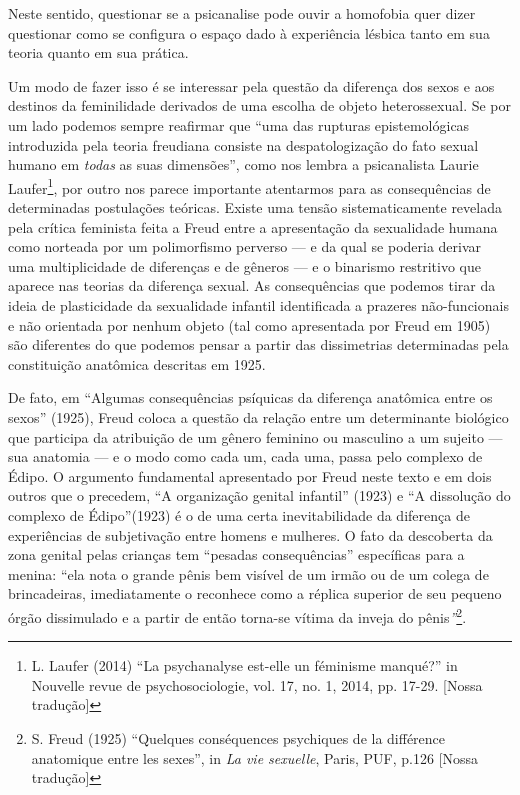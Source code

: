 Neste sentido, questionar se a psicanalise pode ouvir a homofobia quer
dizer questionar como se configura o espaço dado à experiência lésbica
tanto em sua teoria quanto em sua prática.

Um modo de fazer isso é se interessar pela questão da diferença dos
sexos e aos destinos da feminilidade derivados de uma escolha de objeto
heterossexual. Se por um lado podemos sempre reafirmar que ``uma das
rupturas epistemológicas introduzida pela teoria freudiana consiste na
despatologização do fato sexual humano em \emph{todas} as suas
dimensões'', como nos lembra a psicanalista Laurie Laufer\footnote{L.
  Laufer (2014) ``La psychanalyse est-elle un féminisme manqué?'' in
  Nouvelle revue de psychosociologie, vol. 17, no. 1, 2014, pp. 17-29.
  {[}Nossa tradução{]}}, por outro nos parece importante atentarmos para
as consequências de determinadas postulações teóricas. Existe uma tensão
sistematicamente revelada pela crítica feminista feita a Freud entre a
apresentação da sexualidade humana como norteada por um polimorfismo
perverso --- e da qual se poderia derivar uma multiplicidade de
diferenças e de gêneros --- e o binarismo restritivo que aparece nas
teorias da diferença sexual. As consequências que podemos tirar da ideia
de plasticidade da sexualidade infantil identificada a prazeres
não-funcionais e não orientada por nenhum objeto (tal como apresentada
por Freud em 1905) são diferentes do que podemos pensar a partir das
dissimetrias determinadas pela constituição anatômica descritas em 1925.

De fato, em ``Algumas consequências psíquicas da diferença anatômica
entre os sexos'' (1925), Freud coloca a questão da relação entre um
determinante biológico que participa da atribuição de um gênero feminino
ou masculino a um sujeito --- sua anatomia --- e o modo como cada um, cada
uma, passa pelo complexo de Édipo. O argumento fundamental apresentado
por Freud neste texto e em dois outros que o precedem, ``A organização
genital infantil'' (1923) e ``A dissolução do complexo de Édipo''(1923)
é o de uma certa inevitabilidade da diferença de experiências de
subjetivação entre homens e mulheres. O fato da descoberta da zona
genital pelas crianças tem ``pesadas consequências'' específicas para a
menina: ``ela nota o grande pênis bem visível de um irmão ou de um
colega de brincadeiras, imediatamente o reconhece como a réplica
superior de seu pequeno órgão dissimulado e a partir de então torna-se
vítima da inveja do pênis\emph{''}\footnote{S. Freud (1925) ``Quelques
  conséquences psychiques de la différence anatomique entre les sexes'',
  in \emph{La vie sexuelle}, Paris, PUF, p.126 {[}Nossa tradução{]}}.

